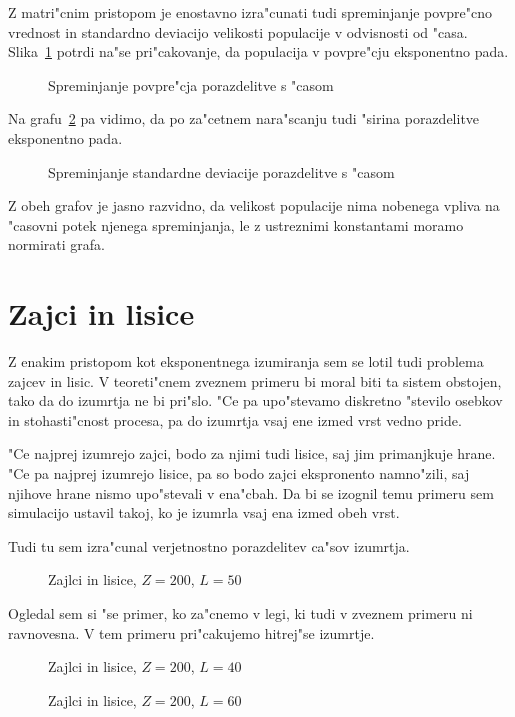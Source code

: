 \documentclass[a4paper,10pt]{article}
\begin{document}
Z matri"cnim pristopom je enostavno izra"cunati tudi spreminjanje povpre"cno vrednost in standardno deviacijo velikosti populacije v odvisnosti od "casa. Slika~\ref{fig:m-povprecje} potrdi na"se pri"cakovanje, da populacija v povpre"cju eksponentno pada. 

\begin{figure}[!h]
 
\caption{Spreminjanje povpre"cja porazdelitve s "casom}
\label{fig:m-povprecje}
\end{figure}

Na grafu~\ref{fig:m-dev} pa vidimo, da po za"cetnem nara"scanju tudi "sirina porazdelitve eksponentno pada. 

\begin{figure}[!h]
 
\caption{Spreminjanje standardne deviacije porazdelitve s "casom}
\label{fig:m-dev}
\end{figure}

Z obeh grafov je jasno razvidno, da velikost populacije nima nobenega vpliva na "casovni potek njenega spreminjanja, le z ustreznimi konstantami moramo normirati grafa. 

\section{Zajci in lisice}

Z enakim pristopom kot eksponentnega izumiranja sem se lotil tudi problema zajcev in lisic. V teoreti"cnem zveznem primeru bi moral biti ta sistem obstojen, tako da do izumrtja ne bi pri"slo. "Ce pa upo"stevamo diskretno "stevilo osebkov in stohasti"cnost procesa, pa do izumrtja vsaj ene izmed vrst vedno pride. 

"Ce najprej izumrejo zajci, bodo za njimi tudi lisice, saj jim primanjkuje hrane. "Ce pa najprej izumrejo lisice, pa so bodo zajci ekspronento namno"zili, saj njihove hrane nismo upo"stevali v ena"cbah. Da bi se izognil temu primeru sem simulacijo ustavil takoj, ko je izumrla vsaj ena izmed obeh vrst. 

Tudi tu sem izra"cunal verjetnostno porazdelitev ca"sov izumrtja. 

\begin{figure}[!h]

\caption{Zajlci in lisice, $Z=200$, $L=50$}
\end{figure}

Ogledal sem si "se primer, ko za"cnemo v legi, ki tudi v zveznem primeru ni ravnovesna. V tem primeru pri"cakujemo hitrej"se izumrtje. 

\begin{figure}[!h]

\caption{Zajlci in lisice, $Z=200$, $L=40$}
\end{figure}

\begin{figure}[!h]

\caption{Zajlci in lisice, $Z=200$, $L=60$}
\end{figure}
\end{document}
